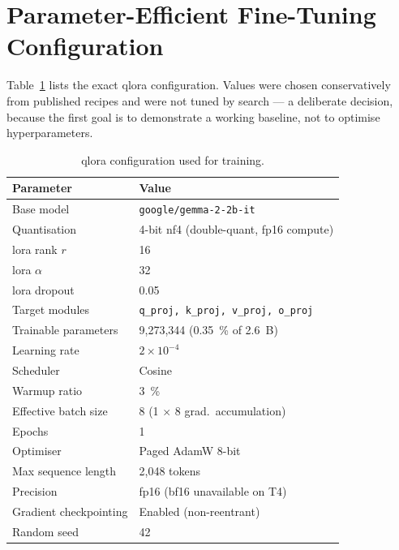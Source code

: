 \documentclass[12pt, a4paper]{report}
\begin{document}
\section{Parameter-Efficient Fine-Tuning Configuration}

Table~\ref{tab:qlora-config} lists the exact \gls{qlora} configuration.
Values were chosen conservatively from published recipes and were not
tuned by search --- a deliberate decision, because the first goal is to
demonstrate a working baseline, not to optimise hyperparameters.

\begin{table}[H]
  \centering
  \caption{\gls{qlora} configuration used for training.}
  \label{tab:qlora-config}
  \small
  \begin{tabular}{ll}
    \toprule
    \textbf{Parameter} & \textbf{Value} \\
    \midrule
    Base model              & \texttt{google/gemma-2-2b-it} \\
    Quantisation            & 4-bit \gls{nf4} (double-quant, fp16 compute) \\
    \gls{lora} rank \(r\)   & 16 \\
    \gls{lora} \(\alpha\)   & 32 \\
    \gls{lora} dropout      & 0.05 \\
    Target modules          & \texttt{q\_proj, k\_proj, v\_proj, o\_proj} \\
    Trainable parameters    & 9{,}273{,}344 (0.35~\% of 2.6~B) \\
    Learning rate           & $2 \times 10^{-4}$ \\
    Scheduler               & Cosine \\
    Warmup ratio            & 3~\% \\
    Effective batch size    & 8 (1 $\times$ 8 grad.\ accumulation) \\
    Epochs                  & 1 \\
    Optimiser               & Paged AdamW 8-bit \\
    Max sequence length     & 2{,}048 tokens \\
    Precision               & fp16 (bf16 unavailable on T4) \\
    Gradient checkpointing  & Enabled (non-reentrant) \\
    Random seed             & 42 \\
    \bottomrule
  \end{tabular}
\end{table}
\end{document}
